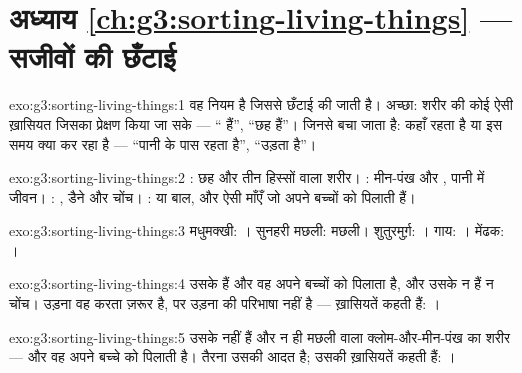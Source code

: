 \section*{अध्याय \ref{ch:g3:sorting-living-things} --- सजीवों की छँटाई}

\begin{solution}{exo:g3:sorting-living-things:1}
 वह नियम है जिससे छँटाई की जाती है। अच्छा: शरीर की कोई ऐसी
ख़ासियत जिसका प्रेक्षण किया जा सके --- `` हैं'', ``छह  हैं''।
जिनसे बचा जाता है: कहाँ रहता है या इस समय क्या कर रहा है --- ``पानी
के पास रहता है'', ``उड़ता है''।
\end{solution}

\begin{solution}{exo:g3:sorting-living-things:2}
: छह  और तीन हिस्सों वाला शरीर। : मीन-पंख और ,
पानी में जीवन। : , डैने और चोंच। :  या बाल, और ऐसी
माँएँ जो अपने बच्चों को  पिलाती हैं।
\end{solution}

\begin{solution}{exo:g3:sorting-living-things:3}
मधुमक्खी: । सुनहरी मछली: मछली। शुतुरमुर्ग़: । गाय: ।
मेंढक: ।
\end{solution}

\begin{solution}{exo:g3:sorting-living-things:4}
उसके  हैं और वह अपने बच्चों को  पिलाता है, और उसके न  हैं न
चोंच। उड़ना वह करता ज़रूर है, पर उड़ना  की परिभाषा नहीं है ---
ख़ासियतें कहती हैं: ।
\end{solution}

\begin{solution}{exo:g3:sorting-living-things:5}
उसके  नहीं हैं और न ही मछली वाला क्लोम-और-मीन-पंख का शरीर --- और
वह अपने बच्चे को  पिलाती है। तैरना उसकी आदत है; उसकी ख़ासियतें
कहती हैं: ।
\end{solution}

